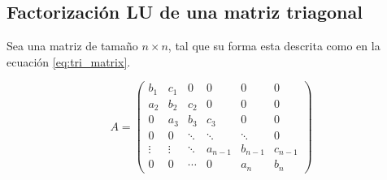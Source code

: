 \subsection{Factorización LU de una matriz triagonal\label{sec:LU_factorization}}

Sea una matriz de tamaño $n \times n$, tal que su forma esta descrita como en la ecuación \ref{eq:tri_matrix}\cite{el_2003}.

\begin{equation}
    A= \begin{pmatrix}
        b_1    & c_1    & 0      & 0       & 0       & 0       \\
        a_2    & b_2    & c_2    & 0       & 0       & 0       \\
        0      & a_3    & b_3    & c_3     & 0       & 0       \\
        0      & 0      & \ddots & \ddots  & \ddots  & 0       \\
        \vdots & \vdots & \ddots & a_{n-1} & b_{n-1} & c_{n-1} \\
        0      & 0      & \cdots & 0       & a_n     & b_n
    \end{pmatrix}
    \label{eq:tri_matrix}
\end{equation}

